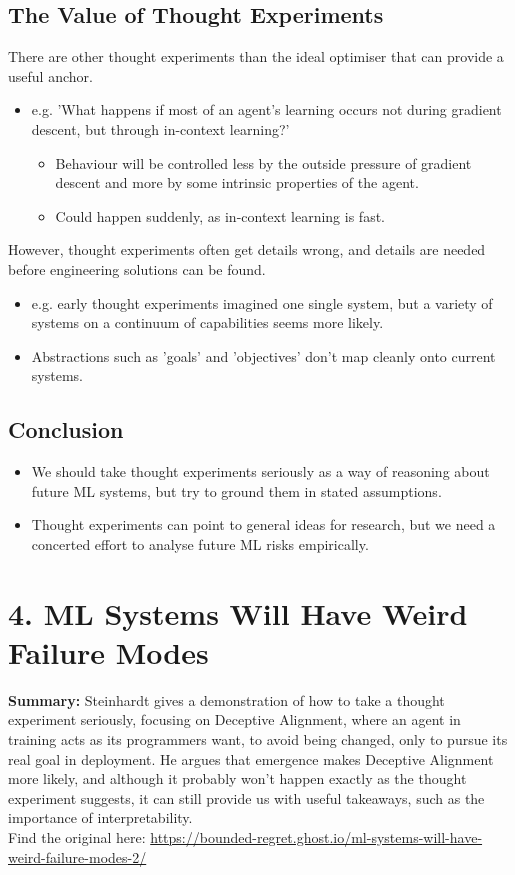 \documentclass{article}
\begin{document}
\begin{multicols}{2}
\subsection*{The Value of Thought Experiments}
There are other thought experiments than the ideal optimiser that can provide a useful anchor.
\begin{itemize}
    \item e.g. 'What happens if most of an agent's learning occurs not during gradient descent, but through in-context learning?'
    \begin{itemize}
        \item Behaviour will be controlled less by the outside pressure of gradient descent and more by some intrinsic properties of the agent.
        \item Could happen suddenly, as in-context learning is fast.
    \end{itemize}
\end{itemize}
However, thought experiments often get details wrong, and details are needed before engineering solutions can be found.
\begin{itemize}
    \item e.g. early thought experiments imagined one single system, but a variety of systems on a continuum of capabilities seems more likely.
    \item Abstractions such as 'goals' and 'objectives' don't map cleanly onto current systems.
\end{itemize}

\subsection*{Conclusion}
\begin{itemize}
    \item We should take thought experiments seriously as a way of reasoning about future ML systems, but try to ground them in stated assumptions.
    \item Thought experiments can point to general ideas for research, but we need a concerted effort to analyse future ML risks empirically.
\end{itemize} 

\section*{4. ML Systems Will Have Weird Failure Modes}
\textbf{Summary:} Steinhardt gives a demonstration of how to take a thought experiment seriously, focusing on Deceptive Alignment, where an agent in training acts as its programmers want, to avoid being changed, only to pursue its real goal in deployment. He argues that emergence makes Deceptive Alignment more likely, and although it probably won't happen exactly as the thought experiment suggests, it can still provide us with useful takeaways, such as the importance of interpretability. \\ Find the original here: \href{https://bounded-regret.ghost.io/ml-systems-will-have-weird-failure-modes-2/}{https://bounded-regret.ghost.io/ml-systems-will-have-weird-failure-modes-2/}


\end{multicols}
\end{document}
